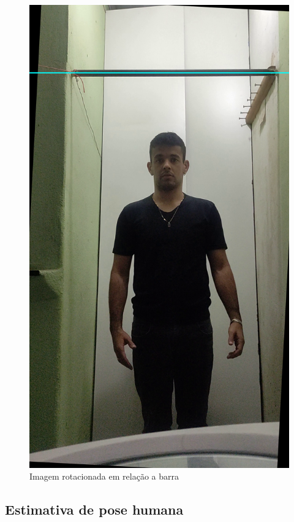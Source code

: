 \begin{figure}[!htb]
	\centering
	\includegraphics[scale=0.12]{figuras/processo/detectarBarra/barra_rotacionada.png}
	\caption{Imagem rotacionada em relação a barra}
	\label{fig:Barra rotacionada}
\end{figure}




\subsection[Reconhecimento de pose humana]{Estimativa de pose humana}\label{sec:Reconhecimento de pose humana}

